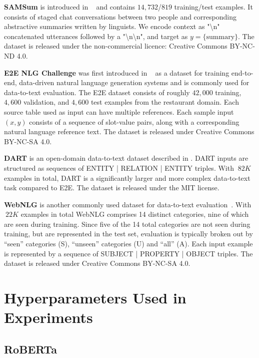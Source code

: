 \documentclass{article} %
\begin{document}
\textbf{SAMSum}
is introduced in ~\cite{DBLP:journals/corr/abs-1911-12237} and contains $14,732$/$819$ training/test examples.
It consists of staged chat conversations between two people and corresponding abstractive summaries written by linguists.
We encode context as "{\textbackslash}n" concatenated utterances followed by a "{\textbackslash}n{\textbackslash}n", and target as $y = \{ \text{summary} \}$.
The dataset is released under the non-commercial licence: Creative Commons BY-NC-ND 4.0.

\textbf{E2E NLG Challenge}
was first introduced in ~\cite{novikova2017e2e} as a dataset for training end-to-end, data-driven natural language generation systems and is commonly used for data-to-text evaluation. The E2E dataset consists of roughly $42,000$ training, $4,600$ validation, and $4,600$ test examples from the restaurant domain. Each source table used as input can have multiple references. Each sample input $(x, y)$ consists of a sequence of slot-value pairs, along with a corresponding natural language reference text.
The dataset is released under Creative Commons BY-NC-SA 4.0.

\textbf{DART}
is an open-domain data-to-text dataset described in \cite{nan2020dart}.
DART inputs are structured as sequences of ENTITY | RELATION | ENTITY triples.
With $~82K$ examples in total, DART is a significantly larger and more complex data-to-text task compared to E2E.
The dataset is released under the MIT license.

\textbf{WebNLG}
is another commonly used dataset for data-to-text evaluation~\citep{gardent2017webnlg}. With $~22K$ examples in total WebNLG comprises 14 distinct categories, nine of which are seen during training. Since five of the 14 total categories are not seen during training, but are represented in the test set, evaluation is typically broken out by ``seen'' categories (S),  ``unseen'' categories (U) and ``all'' (A). Each input example is represented by a sequence of SUBJECT | PROPERTY | OBJECT triples.
The dataset is released under Creative Commons BY-NC-SA 4.0.


\section{Hyperparameters Used in Experiments}

\subsection{RoBERTa}
\label{app:hps_roberta}
\end{document}
